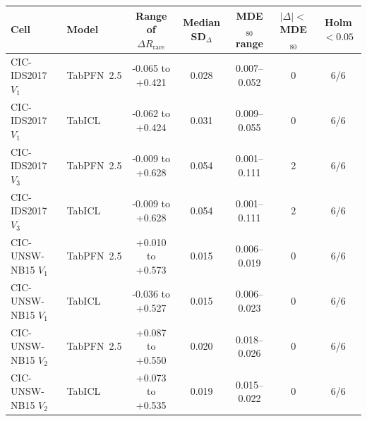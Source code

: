 \begin{tabular}{@{}llcccc c@{}}
\toprule
Cell & Model & Range of $\Delta R_{\mathrm{rare}}$ & Median SD$_\Delta$ & MDE$_{80}$ range & $|\Delta|<$ MDE$_{80}$ & Holm $<0.05$ \\
\midrule
CIC-IDS2017 $V_1$ & TabPFN~2.5 & -0.065 to +0.421 & 0.028 & 0.007--0.052 & 0 & 6/6 \\
CIC-IDS2017 $V_1$ & TabICL & -0.062 to +0.424 & 0.031 & 0.009--0.055 & 0 & 6/6 \\
CIC-IDS2017 $V_3$ & TabPFN~2.5 & -0.009 to +0.628 & 0.054 & 0.001--0.111 & 2 & 6/6 \\
CIC-IDS2017 $V_3$ & TabICL & -0.009 to +0.628 & 0.054 & 0.001--0.111 & 2 & 6/6 \\
CIC-UNSW-NB15 $V_1$ & TabPFN~2.5 & +0.010 to +0.573 & 0.015 & 0.006--0.019 & 0 & 6/6 \\
CIC-UNSW-NB15 $V_1$ & TabICL & -0.036 to +0.527 & 0.015 & 0.006--0.023 & 0 & 6/6 \\
CIC-UNSW-NB15 $V_2$ & TabPFN~2.5 & +0.087 to +0.550 & 0.020 & 0.018--0.026 & 0 & 6/6 \\
CIC-UNSW-NB15 $V_2$ & TabICL & +0.073 to +0.535 & 0.019 & 0.015--0.022 & 0 & 6/6 \\
\bottomrule
\end{tabular}
